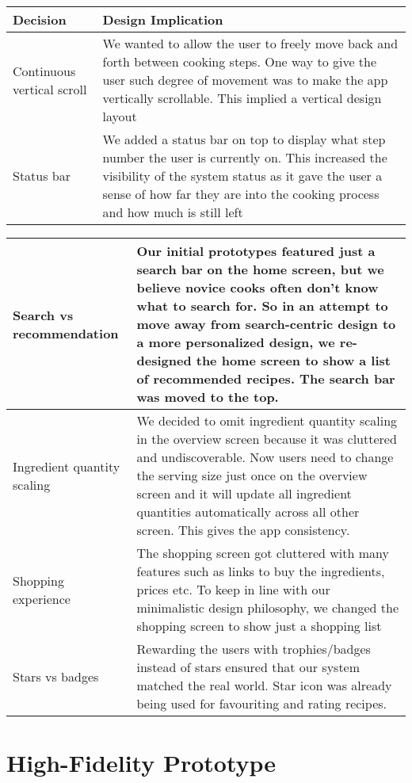 \documentclass{sigchi}
\begin{document}
\begin{tabular}{|p{2cm}|p{5.7cm}|}
\hline
\textbf{Decision} & \textbf{Design Implication} \\ \hline

Continuous vertical scroll & We wanted to allow the user to freely move back and forth between cooking steps. One way to give the user such degree of movement was to make the app vertically scrollable. This implied a vertical design layout \\ \hline
Status bar & We added a status bar on top to display what step number the user is currently on. This increased the visibility of the system status as it gave the user a sense of how far they are into the cooking process and how much is still left \\ \hline

\hline
\end{tabular}

\begin{tabular}{|p{2cm}|p{5.7cm}|}
\hline
Search vs recommendation &
Our initial prototypes featured just a search bar on the home screen, but we believe novice cooks often don’t know what to search for. So in an attempt to move away from search-centric design to a more personalized design, we re-designed the home screen to show a list of recommended recipes. The search bar was moved to the top. \\ \hline
Ingredient quantity scaling &
We decided to omit ingredient quantity scaling in the overview screen because it was cluttered and undiscoverable. Now users need to change the serving size just once on the overview screen and it will update all ingredient quantities automatically across all other screen. This gives the app consistency. \\ \hline
Shopping experience & The shopping screen got cluttered with many features such as links to buy the ingredients, prices etc. To keep in line with our minimalistic design philosophy, we changed the shopping screen to show just a shopping list \\ \hline
Stars vs badges & Rewarding the users with trophies/badges instead of stars ensured that our system matched the real world. Star icon was already being used for favouriting and rating recipes. \\ \hline
\end{tabular}
\newline

\section{High-Fidelity Prototype}
\end{document}
